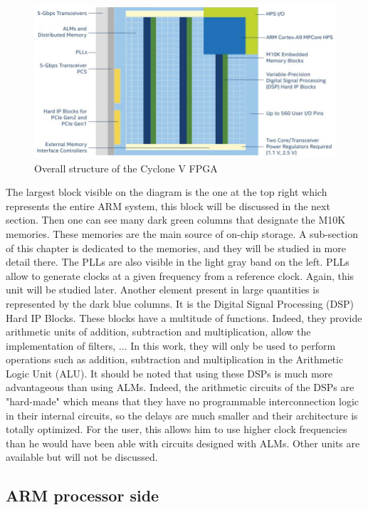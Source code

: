 \begin{figure}[H]
    \centering
    \includegraphics[scale=0.6]{Chapter1-Hardware/res/cycv_structure.PNG}
    \caption{Overall structure 
    of the Cyclone V FPGA}
    \label{fig:cyc5/structure}
\end{figure}

The largest block visible on the diagram is the one at the top right which represents the entire ARM
system, this block will be discussed in the next section. Then one can see many dark 
green columns that designate the M10K memories. These memories are the main source of on-chip 
storage.  A sub-section of this chapter is dedicated to the memories, and they will be studied in more 
detail there. The PLLs are also visible in the light gray band on the left. PLLs allow to 
generate clocks at a given frequency from a reference clock. Again, this unit will be studied later. 
Another element present in large quantities is represented by the dark blue columns. It is the 
Digital Signal Processing (DSP) Hard IP Blocks. These blocks have a multitude of functions. Indeed, 
they provide arithmetic units of addition, subtraction and multiplication, allow the implementation 
of filters, ... In this work, they will only be used to perform operations such as addition, 
subtraction and multiplication in the Arithmetic Logic Unit (ALU). It should be noted that using 
these DSPs is much more advantageous than using ALMs. Indeed, the arithmetic circuits of the DSPs 
are "hard-made" which means that they have no programmable interconnection logic in their internal 
circuits, so the delays are much smaller and their architecture is totally optimized. For the user, 
this allows him to use higher clock frequencies than he would have been able with circuits designed
with ALMs. Other units are available but will not be discussed.

\subsection{ARM processor side}

